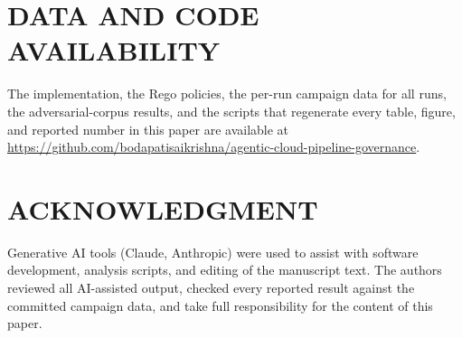 \section*{DATA AND CODE AVAILABILITY}
The implementation, the Rego policies, the per-run campaign data for all \NRunsTotal{} runs, the
adversarial-corpus results, and the scripts that regenerate every table, figure, and reported number
in this paper are available at
\url{https://github.com/bodapatisaikrishna/agentic-cloud-pipeline-governance}.

\section*{ACKNOWLEDGMENT}
Generative AI tools (Claude, Anthropic) were used to assist with software development, analysis
scripts, and editing of the manuscript text. The authors reviewed all AI-assisted output, checked
every reported result against the committed campaign data, and take full responsibility for the
content of this paper.
